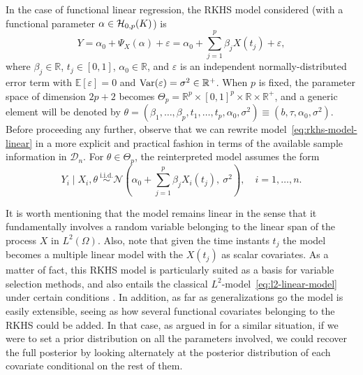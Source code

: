 \documentclass[ba]{imsart}
\numberwithin{equation}{section}
\theoremstyle{plain}
\renewcommand{\epsilon}{\varepsilon}
\newcommand{\R}{\mathbb{R}}
\newcommand{\E}{\mathbb{E}}
\newcommand{\Hcal}{\ensuremath\mathcal{H}}
\newcommand{\Var}{\ensuremath\operatorname{Var}}
\begin{document}
In the case of functional linear regression, the RKHS model considered (with a functional parameter \(\alpha\in \Hcal_{0,p}(K)\)) is
\begin{equation}\label{eq:rkhs-model-linear}
  Y = \alpha_0 + \Psi_X(\alpha) + \epsilon = \alpha_0 + \sum_{j=1}^p \beta_j X(t_j) + \epsilon,
\end{equation}
where \(\beta_j \in \R\), \(t_j \in [0, 1]\), \(\alpha_0\in\R\), and \(\epsilon\) is an independent normally-distributed error term with \(\E[\epsilon]=0\) and \(\Var(\epsilon)=\sigma^2\in \R^+\). When \(p\) is fixed, the parameter space of dimension \(2p + 2\) becomes \(\Theta_p = \R^p \times [0, 1]^p \times \R \times \R^+\), and a generic element will be denoted by \(\theta = (\beta_1,\dots, \beta_p, t_1,\dots, t_p, \alpha_0, \sigma^2) \equiv (b, \tau, \alpha_0, \sigma^2)\). Before proceeding any further, observe that we can rewrite model~\eqref{eq:rkhs-model-linear} in a more explicit and practical fashion in terms of the available sample information in \(\mathcal D_n\). For \(\theta \in \Theta_p\), the reinterpreted model assumes the form
\begin{equation}\label{eq:rkhs-model-linear-2}
  Y_i \mid X_i, \theta \ \stackrel{\text{i.i.d.}}{\sim} \mathcal N\left(\alpha_0 + \sum_{j=1}^p \beta_j X_i(t_j), \ \sigma^2\right), \quad i =1,\dots, n.
\end{equation}

It is worth mentioning that the model remains linear in the sense that it fundamentally involves a random variable belonging to the linear span of the process \(X\) in \(L^2(\Omega)\). Also, note that given the time instants \(t_j\) the model becomes a multiple linear model with the \(X(t_j)\) as scalar covariates. As a matter of fact, this RKHS model is particularly suited as a basis for variable selection methods, and also entails the classical \(L^2\)-model~\eqref{eq:l2-linear-model} under certain conditions \citep[see][Sec.~3]{berrendero2020general}. In addition, as far as generalizations go the model is easily extensible, seeing as how several functional covariates belonging to the RKHS could be added. In that case, as argued in \citet{grollemund2019bayesian} for a similar situation, if we were to set a prior distribution on all the parameters involved, we could recover the full posterior by looking alternately at the posterior distribution of each covariate conditional on the rest of them.
\end{document}
